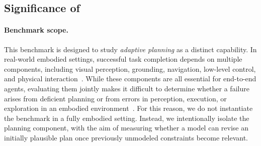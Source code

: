 

\subsection{Significance of \bench{}}
\label{app:discussion-significance-generalization}

\paragraph{Benchmark scope.}
This benchmark is designed to study \emph{adaptive planning} as a distinct capability. In real-world embodied settings, successful task completion depends on multiple components, including visual perception, grounding, navigation, low-level control, and physical interaction~\citep{shridhar2020alfredbenchmarkinterpretinggrounded, ahn2022icanisay,srivastava2022behavior,liu-etal-2025-revisiting}.
While these components are all essential for end-to-end agents, evaluating them jointly makes it difficult to determine whether a failure arises from deficient planning or from errors in perception, execution, or exploration in an embodied environment~\citep{chang2024partnrbenchmarkplanningreasoning,bhatt2025knowyoureuncertainplanning}. 
For this reason, we do not instantiate the benchmark in a fully embodied setting. Instead, we intentionally isolate the planning component, with the aim of measuring whether a model can revise an initially plausible plan once previously unmodeled constraints become relevant.

